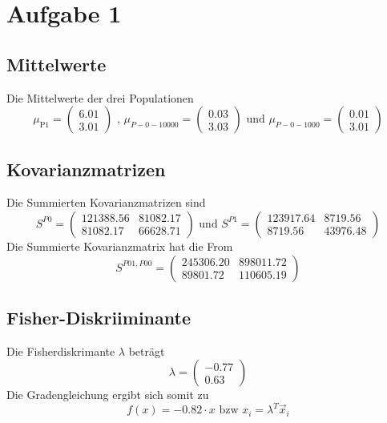 \section*{Aufgabe 1}
\subsection*{Mittelwerte}

Die Mittelwerte der drei Populationen 
\begin{equation}
  \mu_\text{P1} = \begin{pmatrix} 6.01 \\ 3.01 \end{pmatrix} \text{ , } \mu_{P-0-10000} = \begin{pmatrix} 0.03 \\ 3.03 \end{pmatrix} \text{ und } \mu_{P-0-1000} = \begin{pmatrix} 0.01 \\ 3.01 \end{pmatrix}
\end{equation}
\subsection*{Kovarianzmatrizen}
Die Summierten Kovarianzmatrizen sind
\begin{equation}
  S^{P0} = \begin{pmatrix} 121388.56 & 81082.17 \\ 81082.17 & 66628.71 \end{pmatrix} \text{ und } S^{P1} = \begin{pmatrix} 123917.64 & 8719.56 \\ 8719.56 & 43976.48 \end{pmatrix}
\end{equation}
Die Summierte Kovarianzmatrix hat die From
\begin{equation}
  S^{P01,P00} = \begin{pmatrix} 245306.20 & 898011.72 \\ 89801.72 & 110605.19 \end{pmatrix}
\end{equation}
\subsection*{Fisher-Diskriiminante}
Die Fisherdiskrimante $\lambda$ beträgt 
\begin{equation}
  \lambda = \begin{pmatrix} -0.77 \\ 0.63 \end{pmatrix}
\end{equation}
Die Gradengleichung ergibt sich somit zu
\begin{equation}
  f(x) = -0.82 \cdot x \text{    bzw    } x_i = \lambda^T \vec{x}_i
\end{equation}
